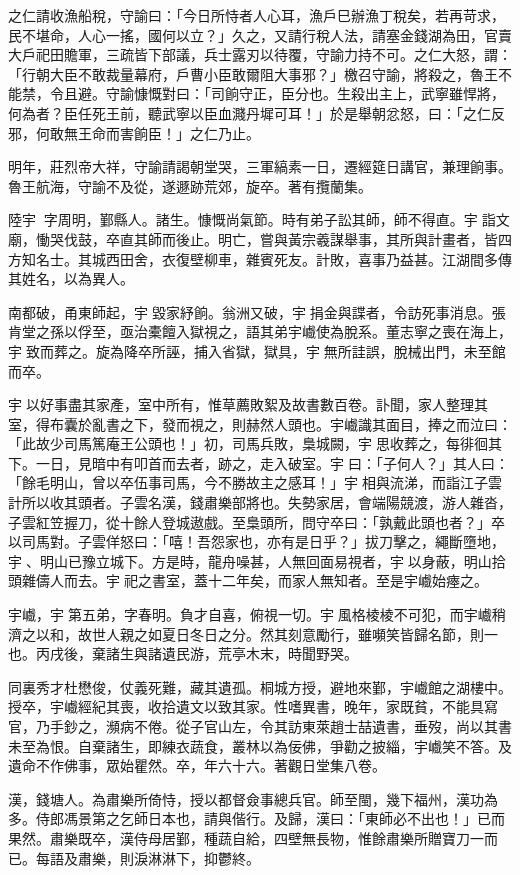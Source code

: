 \begin{pinyinscope}
之仁請收漁船稅，守諭曰：「今日所恃者人心耳，漁戶巳辦漁丁稅矣，若再苛求，民不堪命，人心一搖，國何以立？」久之，又請行稅人法，請塞金錢湖為田，官賣大戶祀田贍軍，三疏皆下部議，兵士露刃以待覆，守諭力持不可。之仁大怒，謂：「行朝大臣不敢裁量幕府，戶曹小臣敢爾阻大事邪？」檄召守諭，將殺之，魯王不能禁，令且避。守諭慷慨對曰：「司餉守正，臣分也。生殺出主上，武寧雖悍將，何為者？臣任死王前，聽武寧以臣血濺丹墀可耳！」於是舉朝忿怒，曰：「之仁反邪，何敢無王命而害餉臣！」之仁乃止。

明年，莊烈帝大祥，守諭請謁朝堂哭，三軍縞素一日，遷經筵日講官，兼理餉事。魯王航海，守諭不及從，遂遯跡荒郊，旋卒。著有攬蘭集。

陸宇，字周明，鄞縣人。諸生。慷慨尚氣節。時有弟子訟其師，師不得直。宇詣文廟，慟哭伐鼓，卒直其師而後止。明亡，嘗與黃宗羲謀舉事，其所與計畫者，皆四方知名士。其城西田舍，衣復壁柳車，雜賓死友。計敗，喜事乃益甚。江湖間多傳其姓名，以為異人。

南都破，甬東師起，宇毀家紓餉。翁洲又破，宇捐金與諜者，令訪死事消息。張肯堂之孫以俘至，亟治橐饘入獄視之，語其弟宇巇使為脫系。董志寧之喪在海上，宇致而葬之。旋為降卒所誣，捕入省獄，獄具，宇無所詿誤，脫械出門，未至館而卒。

宇以好事盡其家產，室中所有，惟草薦敗絮及故書數百卷。訃聞，家人整理其室，得布囊於亂書之下，發而視之，則赫然人頭也。宇巇識其面目，捧之而泣曰：「此故少司馬篤庵王公頭也！」初，司馬兵敗，梟城闕，宇思收葬之，每徘徊其下。一日，見暗中有叩首而去者，跡之，走入破室。宇曰：「子何人？」其人曰：「餘毛明山，曾以卒伍事司馬，今不勝故主之感耳！」宇相與流涕，而詣江子雲計所以收其頭者。子雲名漢，錢肅樂部將也。失勢家居，會端陽競渡，游人雜沓，子雲紅笠握刀，從十餘人登城遨戲。至梟頭所，問守卒曰：「孰戴此頭也者？」卒以司馬對。子雲佯怒曰：「嘻！吾怨家也，亦有是日乎？」拔刀擊之，繩斷墮地，宇、明山已豫立城下。方是時，龍舟噪甚，人無回面易視者，宇以身蔽，明山拾頭雜儔人而去。宇祀之書室，蓋十二年矣，而家人無知者。至是宇巇始瘞之。

宇巇，宇第五弟，字春明。負才自喜，俯視一切。宇風格棱棱不可犯，而宇巇稍濟之以和，故世人親之如夏日冬日之分。然其刻意勵行，雖嚬笑皆歸名節，則一也。丙戌後，棄諸生與諸遺民游，荒亭木末，時聞野哭。

同裏秀才杜懋俊，仗義死難，藏其遺孤。桐城方授，避地來鄞，宇巇館之湖樓中。授卒，宇巇經紀其喪，收拾遺文以致其家。性嗜異書，晚年，家既貧，不能具寫官，乃手鈔之，瀕病不倦。從子官山左，令其訪東萊趙士喆遺書，垂歿，尚以其書未至為恨。自棄諸生，即練衣蔬食，叢林以為佞佛，爭勸之披緇，宇巇笑不答。及遺命不作佛事，眾始瞿然。卒，年六十六。著觀日堂集八卷。

漢，錢塘人。為肅樂所倚恃，授以都督僉事總兵官。師至閩，幾下福州，漢功為多。侍郎馮景第之乞師日本也，請與偕行。及歸，漢曰：「東師必不出也！」已而果然。肅樂既卒，漢侍母居鄞，種蔬自給，四壁無長物，惟餘肅樂所贈寶刀一而已。每語及肅樂，則淚淋淋下，抑鬱終。


\end{pinyinscope}
